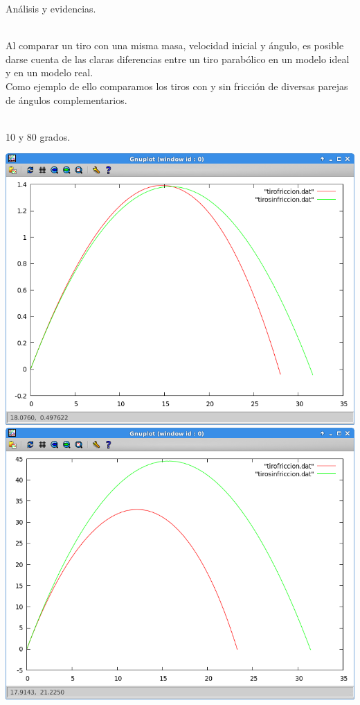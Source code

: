 \documentclass[12pt]{article}
\begin{document}
\newpage
\begin{LARGE}
Análisis y evidencias.
\end{LARGE}
\\
Al comparar un tiro con una misma masa, velocidad inicial y ángulo, es posible darse cuenta de las claras diferencias entre un tiro parabólico en un modelo ideal y en un modelo real.\\
Como ejemplo de ello comparamos los tiros con y sin fricción de diversas parejas de ángulos complementarios.\\
\\
\begin{large}
10 y 80 grados.
\end{large}
\begin{center}
\includegraphics[scale=0.8]{producto610.png}
\includegraphics[scale=0.8]{producto680.png}
\end{center}
\end{document}
